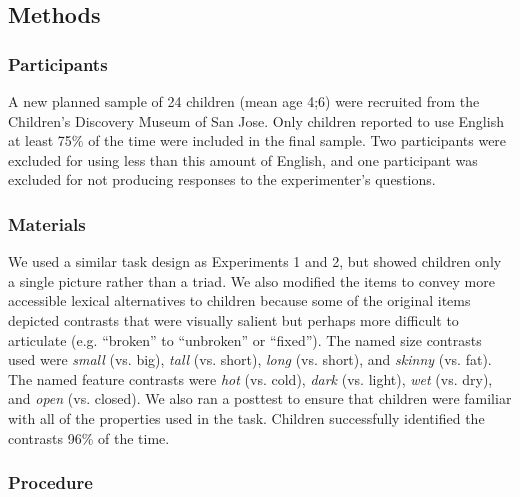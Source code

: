\documentclass[man]{apa2}
\begin{document}

\subsection{Methods}

\subsubsection{Participants}

A new planned sample of 24 children (mean age 4;6) were recruited from the Children's Discovery Museum of San Jose.  Only children reported to use English at least 75\% of the time were included in the final sample.  Two participants were excluded for using less than this amount of English, and one participant was excluded for not producing responses to the experimenter's questions.

\subsubsection{Materials}

We used a similar task design as Experiments 1 and 2, but showed children only a single picture rather than a triad.  We also modified the items to convey more accessible lexical alternatives to children because some of the original items depicted contrasts that were visually salient but perhaps more difficult to articulate (e.g. ``broken'' to ``unbroken'' or ``fixed'').  The named size contrasts used were \emph{small} (vs. big), \emph{tall} (vs. short), \emph{long} (vs. short), and \emph{skinny} (vs. fat).  The named feature contrasts were \emph{hot} (vs. cold), \emph{dark} (vs. light), \emph{wet} (vs. dry), and \emph{open} (vs. closed).  We also ran a posttest to ensure that children were familiar with all of the properties used in the task.  Children successfully identified the contrasts 96\% of the time.

\subsubsection{Procedure}
\end{document}
